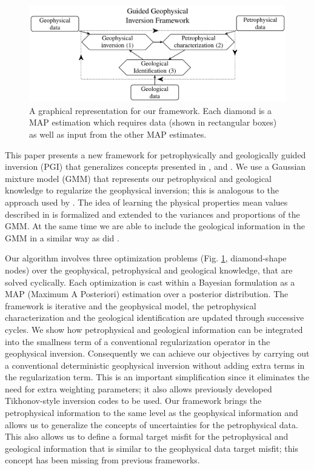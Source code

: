 \documentclass[extra]{gji} %
\begin{document}
\begin{figure}
    \includegraphics[width=\columnwidth]{./Fig/LowRes/Framework_with_numbers.png}
    \caption{A graphical representation for our framework. Each diamond is a MAP estimation which requires data (shown in rectangular boxes) as well as input from the other MAP estimates.
    }
    \label{graph_simple}
\end{figure}

This paper presents a new framework for petrophysically and geologically guided inversion (PGI) that generalizes concepts presented in \cite{Grana2017}, \cite{Giraud2017} and \cite{Sun2015}. We use a Gaussian mixture model (GMM) that represents our petrophysical and geological knowledge to regularize the geophysical inversion; this is analogous to the approach used by \cite{Grana2017}. The idea of learning the physical properties mean values described in \cite{Sun2015} is formalized and extended to the variances and proportions of the GMM.  At the same time we are able to include the geological information in the GMM in a similar way as did \cite{Giraud2017}.

Our algorithm involves three optimization problems (Fig. \ref{graph_simple}, diamond-shape nodes) over the geophysical, petrophysical and geological knowledge, that are solved cyclically. Each optimization is cast within a Bayesian formulation as a MAP (Maximum A Posteriori) estimation over a posterior distribution. The framework is iterative and the geophysical model, the petrophysical characterization and the geological identification are updated through successive cycles. We show how petrophysical and geological information can be integrated into the smallness term of a conventional regularization operator in the geophysical inversion. Consequently we can achieve our objectives by carrying out a conventional deterministic geophysical inversion without adding extra terms in the regularization term. This is an important simplification since it eliminates the need for extra weighting parameters; it also allows previously developed Tikhonov-style inversion codes to be used. Our framework brings the petrophysical information to the same level as the geophysical information and allows us to generalize the concepts of uncertainties for the petrophysical data. This also allows us to define a formal target misfit for the petrophysical and geological information that is similar to the geophysical data target misfit; this concept has been missing from previous frameworks.
\end{document}
